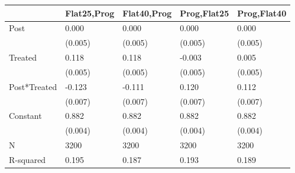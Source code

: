 \begin{tabular}{lllll}
\toprule
 & Flat25,Prog & Flat40,Prog & Prog,Flat25 & Prog,Flat40 \\
\midrule
Post & 0.000 & 0.000 & 0.000 & 0.000 \\
 & (0.005) & (0.005) & (0.005) & (0.005) \\
Treated & 0.118 & 0.118 & -0.003 & 0.005 \\
 & (0.005) & (0.005) & (0.005) & (0.005) \\
Post*Treated & -0.123 & -0.111 & 0.120 & 0.112 \\
 & (0.007) & (0.007) & (0.007) & (0.007) \\
Constant & 0.882 & 0.882 & 0.882 & 0.882 \\
 & (0.004) & (0.004) & (0.004) & (0.004) \\
N & 3200 & 3200 & 3200 & 3200 \\
R-squared & 0.195 & 0.187 & 0.193 & 0.189 \\
\bottomrule
\end{tabular}
